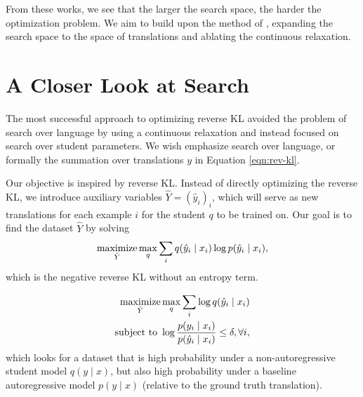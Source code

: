 \documentclass[11pt]{article}
\begin{document}
From these works, we see that the larger the search space, the harder the optimization problem.
We aim to build upon the method of \citet{engine}, expanding the search space
to the space of translations and ablating the continuous relaxation.

\section{A Closer Look at Search}
The most successful approach to optimizing reverse KL avoided the problem of search over language
by using a continuous relaxation and instead focused on search over student parameters.
We wish emphasize search over language, or formally the summation over translations
$y$ in Equation \ref{eqn:rev-kl}.

Our objective is inspired by reverse KL.
Instead of directly optimizing the reverse KL,
we introduce auxiliary variables $\hat{Y} = (\hat{y}_i)_i$,
which will serve as new translations for each example $i$
for the student $q$ to be trained on.
Our goal is to find the dataset $\hat{Y}$ by solving
\begin{equation}
    \operatorname*{maximize}_{\hat{Y}} \max_q \sum_i  q(\hat{y}_i \mid x_i) \log p(\hat{y}_i \mid x_i),
\end{equation}
which is the negative reverse KL without an entropy term.


\begin{equation}
    \begin{aligned}
    \operatorname*{maximize}_{\hat{Y}}& \max_q \sum_i \log q(\hat{y}_i \mid x_i)\\
    \textnormal{subject to } & \log\frac{p(y_i \mid x_i)}{p(\hat{y}_i \mid x_i)}
        \le \delta, \forall i,
    \end{aligned}
\end{equation}
which looks for a dataset that is high probability under a non-autoregressive student model
$q(y \mid x)$, but also high probability under a baseline autoregressive model $p(y \mid x)$
(relative to the ground truth translation).
\end{document}
